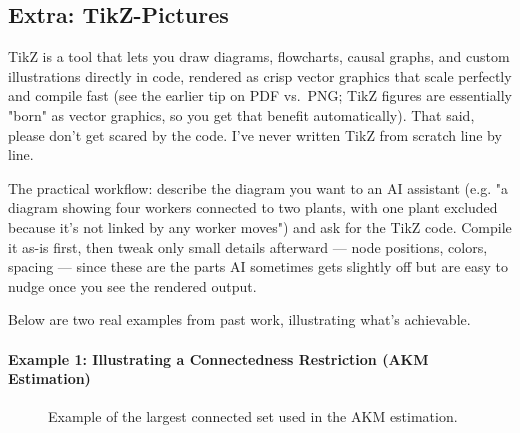 \newpage

\subsection*{Extra: TikZ-Pictures}
TikZ is a tool that lets you draw diagrams, flowcharts, causal graphs, and custom illustrations directly in code, rendered as crisp vector graphics that scale perfectly and compile fast (see the earlier tip on PDF vs.\ PNG; TikZ figures are essentially "born" as vector graphics, so you get that benefit automatically). That said, please don't get scared by the code. I've never written TikZ from scratch line by line.

 The practical workflow: describe the diagram you want to an AI assistant (e.g. "a diagram showing four workers connected to two plants, with one plant excluded because it's not linked by any worker moves") and ask for the TikZ code. Compile it as-is first, then tweak only small details afterward --- node positions, colors, spacing --- since these are the parts AI sometimes gets slightly off but are easy to nudge once you see the rendered output.

Below are two real examples from past work, illustrating what's achievable.

\paragraph{Example 1: Illustrating a Connectedness Restriction (AKM Estimation)}
\begin{figure}[H]
\centering
{}
\caption{Example of the largest connected set used in the AKM estimation.}
\label{fig:example_tikz_1}
\end{figure}

